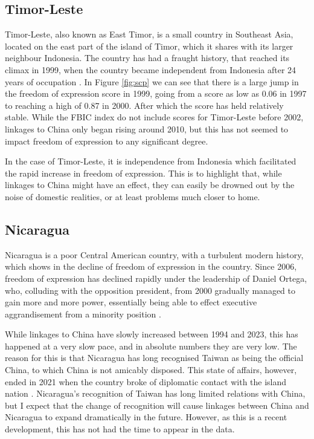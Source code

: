 \subsection{Timor-Leste}
Timor-Leste, also known as East Timor, is a small country in Southeast Asia, located on the east part of the island of Timor, which it shares with its larger neighbour Indonesia. The country has had a fraught history, that reached its climax in 1999, when the country became independent from Indonesia after 24 years of occupation \citep[p. 183]{kingsbury_democratic_2014}. In Figure \ref{fig:scp} we can see that there is a large jump in the freedom of expression score in 1999, going from a score as low as 0.06 in 1997 to reaching a high of 0.87 in 2000. After which the score has held relatively stable. While the FBIC index do not include scores for Timor-Leste before 2002, linkages to China only began rising around 2010, but this has not seemed to impact freedom of expression to any significant degree.

In the case of Timor-Leste, it is independence from Indonesia which facilitated the rapid increase in freedom of expression. This is to highlight that, while linkages to China might have an effect, they can easily be drowned out by the noise of domestic realities, or at least problems much closer to home.

\subsection{Nicaragua}
Nicaragua is a poor Central American country, with a turbulent modern history, which shows in the decline of freedom of expression in the country. Since 2006, freedom of expression has declined rapidly under the leadership of Daniel Ortega, who, colluding with the opposition president, from 2000 gradually managed to gain more and more power, essentially being able to effect executive aggrandisement from a minority position \citep{mcconnell_elite_2024}.

While linkages to China have slowly increased between 1994 and 2023, this has happened at a very slow pace, and in absolute numbers they are very low. The reason for this is that Nicaragua has long recognised Taiwan as being the official China, to which China is not amicably disposed. This state of affairs, however, ended in 2021 when the country broke of diplomatic contact with the island nation \citep{bbc_nicaragua_2021}. Nicaragua's recognition of Taiwan has long limited relations with China, but I expect that the change of recognition will cause linkages between China and Nicaragua to expand dramatically in the future. However, as this is a recent development, this has not had the time to appear in the data. 

